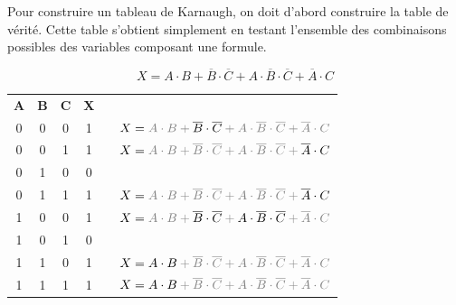\documentclass[11pt,a4paper]{article}
\begin{document}
\medskip

Pour construire un tableau de Karnaugh, on doit d'abord construire la table de vérité.
Cette table s'obtient simplement en testant l'ensemble des combinaisons possibles des variables composant une formule.

\medskip

$$
X = A \cdot B + \overline{B} \cdot \overline{C} + A \cdot \overline{B} \cdot \overline{C} + \overline{A} \cdot C
$$

\begin{center}
\begin{tabular}{| c | c | c || c | m{0.5cm} l }
\cline{0-3}
\cellcolor{black!15} \textbf{A} & \cellcolor{black!15} \textbf{B} & \cellcolor{black!15} \textbf{C}  &  \cellcolor{black!15} \textbf{X}  & & \\
\cline{0-3}
0 & 0 & 0  &  \cellcolor{black!15} 1  & & $ X = \textcolor{gray}{A \cdot B + \textcolor{black}{\overline{B} \cdot \overline{C}} + A \cdot \overline{B} \cdot \overline{C} + \overline{A} \cdot C} $ \\ \cline{0-3}
0 & 0 & 1  &  \cellcolor{black!15} 1  & & $ X = \textcolor{gray}{A \cdot B + \overline{B} \cdot \overline{C} + A \cdot \overline{B} \cdot \overline{C} + \textcolor{black}{\overline{A} \cdot C}} $ \\ \cline{0-3}
0 & 1 & 0  &  \cellcolor{black!15} 0  & & \\ \cline{0-3}
0 & 1 & 1  &  \cellcolor{black!15} 1  & & $ X = \textcolor{gray}{A \cdot B + \overline{B} \cdot \overline{C} + A \cdot \overline{B} \cdot \overline{C} + \textcolor{black}{\overline{A} \cdot C}} $ \\ \cline{0-3}
1 & 0 & 0  &  \cellcolor{black!15} 1  & & $ X = \textcolor{gray}{A \cdot B + \textcolor{black}{\overline{B} \cdot \overline{C}} + \textcolor{black}{A \cdot \overline{B} \cdot \overline{C}} + \overline{A} \cdot C} $ \\ \cline{0-3}
1 & 0 & 1  &  \cellcolor{black!15} 0  & & \\ \cline{0-3}
1 & 1 & 0  &  \cellcolor{black!15} 1  & & $ X = \textcolor{gray}{\textcolor{black}{A \cdot B} + \overline{B} \cdot \overline{C} + A \cdot \overline{B} \cdot \overline{C} + \overline{A} \cdot C} $ \\ \cline{0-3}
1 & 1 & 1  &  \cellcolor{black!15} 1  & & $ X = \textcolor{gray}{\textcolor{black}{A \cdot B} + \overline{B} \cdot \overline{C} + A \cdot \overline{B} \cdot \overline{C} + \overline{A} \cdot C} $ \\ \cline{0-3}
\end{tabular}
\end{center}
\end{document}
